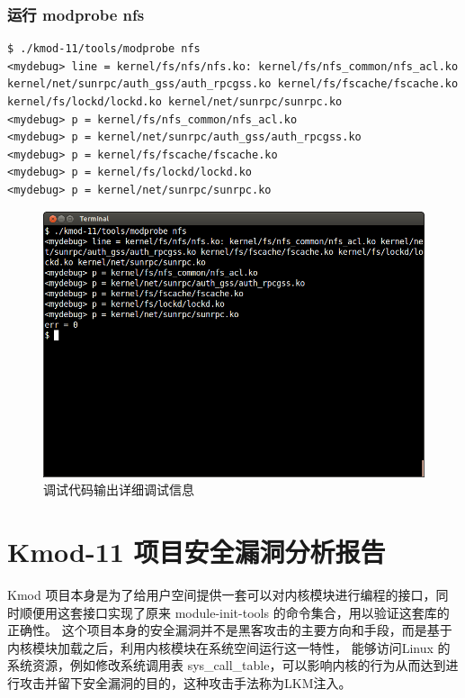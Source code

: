 \subsection{运行 modprobe nfs}

{\begin{shaded}\begin{verbatim}
$ ./kmod-11/tools/modprobe nfs
<mydebug> line = kernel/fs/nfs/nfs.ko: kernel/fs/nfs_common/nfs_acl.ko kernel/net/sunrpc/auth_gss/auth_rpcgss.ko kernel/fs/fscache/fscache.ko kernel/fs/lockd/lockd.ko kernel/net/sunrpc/sunrpc.ko
<mydebug> p = kernel/fs/nfs_common/nfs_acl.ko
<mydebug> p = kernel/net/sunrpc/auth_gss/auth_rpcgss.ko
<mydebug> p = kernel/fs/fscache/fscache.ko
<mydebug> p = kernel/fs/lockd/lockd.ko
<mydebug> p = kernel/net/sunrpc/sunrpc.ko
\end{verbatim}\end{shaded}}
\begin{figure}[htbp]
\centering
\includegraphics{./pictures/3-5-print-p-output.png}
\caption{调试代码输出详细调试信息}
\end{figure}

\chapter{Kmod-11 项目安全漏洞分析报告}

Kmod
项目本身是为了给用户空间提供一套可以对内核模块进行编程的接口，同时顺便用这套接口实现了原来
module-init-tools 的命令集合，用以验证这套库的正确性。
这个项目本身的安全漏洞并不是黑客攻击的主要方向和手段，而是基于内核模块加载之后，利用内核模块在系统空间运行这一特性，
能够访问Linux 的系统资源，例如修改系统调用表
sys\_call\_table，可以影响内核的行为从而达到进行攻击并留下安全漏洞的目的，这种攻击手法称为LKM注入。

